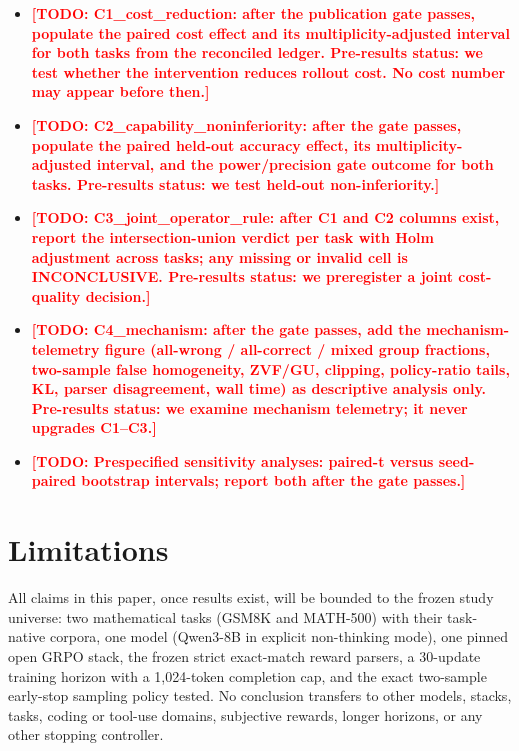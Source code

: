 \documentclass[11pt]{article}
\newcommand{\todo}[1]{\textcolor{red}{\textbf{[TODO: #1]}}}
\begin{document}
\begin{itemize}
  \item \todo{C1\_cost\_reduction: after the publication gate passes, populate the paired cost effect and its multiplicity-adjusted interval for both tasks from the reconciled ledger. Pre-results status: we test whether the intervention reduces rollout cost. No cost number may appear before then.}
  \item \todo{C2\_capability\_noninferiority: after the gate passes, populate the paired held-out accuracy effect, its multiplicity-adjusted interval, and the power/precision gate outcome for both tasks. Pre-results status: we test held-out non-inferiority.}
  \item \todo{C3\_joint\_operator\_rule: after C1 and C2 columns exist, report the intersection-union verdict per task with Holm adjustment across tasks; any missing or invalid cell is INCONCLUSIVE. Pre-results status: we preregister a joint cost-quality decision.}
  \item \todo{C4\_mechanism: after the gate passes, add the mechanism-telemetry figure (all-wrong / all-correct / mixed group fractions, two-sample false homogeneity, ZVF/GU, clipping, policy-ratio tails, KL, parser disagreement, wall time) as descriptive analysis only. Pre-results status: we examine mechanism telemetry; it never upgrades C1--C3.}
  \item \todo{Prespecified sensitivity analyses: paired-t versus seed-paired bootstrap intervals; report both after the gate passes.}
\end{itemize}

\section{Limitations}
\label{sec:limitations}

All claims in this paper, once results exist, will be bounded to the frozen study universe: two mathematical tasks (GSM8K and MATH-500) with their task-native corpora, one model (Qwen3-8B in explicit non-thinking mode), one pinned open GRPO stack, the frozen strict exact-match reward parsers, a 30-update training horizon with a 1{,}024-token completion cap, and the exact two-sample early-stop sampling policy tested. No conclusion transfers to other models, stacks, tasks, coding or tool-use domains, subjective rewards, longer horizons, or any other stopping controller.
\end{document}
